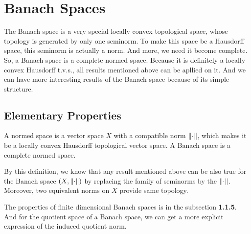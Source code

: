 \documentclass[a4paper,11pt]{report}
\begin{document}
\section{Banach Spaces}

The Banach space is a very special locally convex topological space, whose topology is generated by only one seminorm. To make this space be a Hausdorff space, this seminorm is actually a norm. And more, we need it become complete. So, a Banach space is a complete normed space. Because it is definitely a locally convex Hausdorff t.v.s., all results mentioned above can be apllied on it. And we can have more interesting results of the Banach space because of its simple structure.

\subsection{Elementary Properties}

\begin{defn}
	A normed space is a vector space $X$ with a compatible norm $\left\lVert\cdot\right\lVert$, which makes it be a locally convex Hausdorff topological vector space. A Banach space is a complete normed space.
\end{defn}
\begin{rem}
	By this definition, we know that any result mentioned above can be also true for the Banach space $(X,\left\lVert\cdot\right\lVert)$ by replacing the family of seminorms by the $\left\lVert\cdot\right\lVert$. Moreover, two equivalent norms on $X$ provide same topology.
\end{rem}

The properties of finite dimensional Banach spaces is in the subsection \textbf{1.1.5}. And for the quotient space of a Banach space, we can get a more explicit expression of the induced quotient norm.
\end{document}
